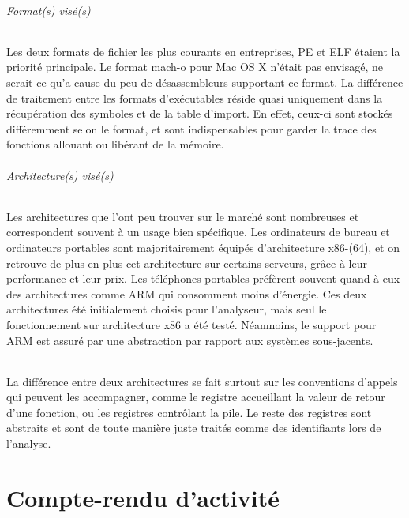 \subparagraph{Format(s) visé(s)}

Les deux formats de fichier les plus courants en entreprises, PE et ELF étaient la priorité principale. Le format mach-o pour
Mac OS X n'était pas envisagé, ne serait ce qu'a cause du peu de désassembleurs supportant ce format. La différence de traitement
entre les formats d'exécutables réside quasi uniquement dans la récupération des symboles et de la table d'import. En effet, ceux-ci
sont stockés différemment selon le format, et sont indispensables pour garder la trace des fonctions allouant ou libérant de la mémoire.

\subparagraph{Architecture(s) visé(s)}
Les architectures que l'ont peu trouver sur le marché sont nombreuses et correspondent souvent à un usage bien spécifique.
Les ordinateurs de bureau et ordinateurs portables sont majoritairement équipés d'architecture x86-(64), et on retrouve de plus en plus
cet architecture sur certains serveurs, grâce à leur performance et leur prix. Les téléphones portables préfèrent souvent quand à eux
des architectures comme ARM qui consomment moins d'énergie. Ces deux architectures été initialement choisis pour l'analyseur, mais seul
le fonctionnement sur architecture x86 a été testé. Néanmoins, le support pour ARM est assuré par une abstraction par rapport aux systèmes
sous-jacents.
\subparagraph{}
La différence entre deux architectures se fait surtout sur les conventions d'appels qui peuvent les accompagner, comme le registre accueillant
la valeur de retour d'une fonction, ou les registres contrôlant la pile. Le reste des registres sont abstraits et sont de toute manière
juste traités comme des identifiants lors de l'analyse.


\chapter{Compte-rendu d'activité}
